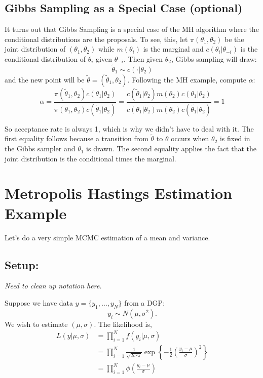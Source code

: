 \documentclass[twoside]{article}
\begin{document}
\subsection{Gibbs Sampling as a Special Case (optional)}

It turns out that Gibbs Sampling is a special case of the MH algorithm where the conditional distributions are the proposals. To see, this, let $\pi(\theta_1, \theta_2)$ be the joint distribution of $(\theta_1, \theta_2)$ while $m(\theta_i)$ is the marginal and $c(\theta_i|\theta_{-i})$ is the conditional distribution of $\theta_i$ given $\theta_{-i}$. 
Then given $\theta_2$, Gibbs sampling will draw:
$$\tilde{\theta}_1 \sim c( \cdot | \theta_2)$$
and the new point will be $\tilde{\theta} = (\tilde{\theta}_1, \theta_2)$. Following the MH example, compute $\alpha$: 
$$ \alpha = \frac{ \pi(\tilde{\theta}_1, \theta_2)c(\theta_1 | \theta_2)}{ \pi(\theta_1, \theta_2)c(\tilde{\theta_1} | \theta_2)} = 
 \frac{ c(\tilde{\theta}_1| \theta_2)m(\theta_2)c(\theta_1 | \theta_2)}{ c(\theta_1 | \theta_2)m(\theta_2)c(\tilde{\theta_1} | \theta_2)} = 1$$
 
So acceptance rate is always 1, which is why we didn't have to deal with it.  The first equality follows because a transition from $\tilde{\theta}$ to
$\theta$ occurs when $\theta_2$ is fixed in the Gibbs sampler and $\theta_1$ is drawn. The second equality applies the fact that the joint distribution
is the conditional times the marginal. 

\section{Metropolis Hastings Estimation Example}

Let's do a very simple MCMC estimation of a mean and variance. 

\subsection{Setup:}

\emph{Need to clean up notation here.}

Suppose we have data $y = \{y_1, \ldots, y_N\}$ from a DGP: 
$$ y_i \sim N(\mu, \sigma^2).$$ 
We wish to estimate $(\mu, \sigma)$. The likelihood is, 
\begin{align*}
 L(y | \mu, \sigma) & = \prod_{i=1}^N f(y_i | \mu, \sigma) \\
 & =  \prod_{i=1}^N \frac{1}{\sqrt{2 \sigma^2 \pi}} \exp \left\{ - \frac{1}{2} \left( \frac{y_i - \mu}{\sigma} \right)^2 \right\} \\
 & = \prod_{i=1}^N \phi\left( \frac{y_i - \mu}{\sigma} \right) %
 \end{align*}
\end{document}
